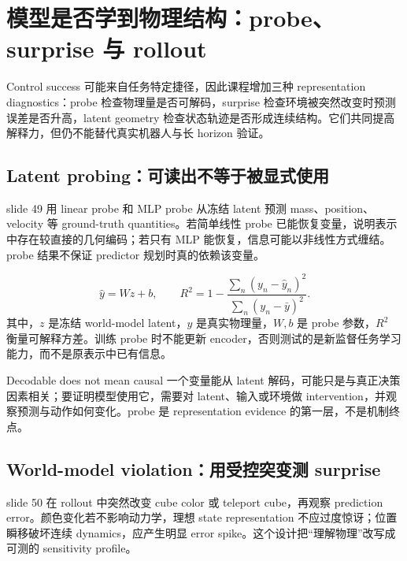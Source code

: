 \section{模型是否学到物理结构：probe、surprise 与 rollout}

Control success 可能来自任务特定捷径，因此课程增加三种 representation diagnostics：probe 检查物理量是否可解码，surprise 检查环境被突然改变时预测误差是否升高，latent geometry 检查状态轨迹是否形成连续结构。它们共同提高解释力，但仍不能替代真实机器人与长 horizon 验证。

\subsection{Latent probing：可读出不等于被显式使用}

slide 49 用 linear probe 和 MLP probe 从冻结 latent 预测 mass、position、velocity 等 ground-truth quantities。若简单线性 probe 已能恢复变量，说明表示中存在较直接的几何编码；若只有 MLP 能恢复，信息可能以非线性方式缠结。probe 结果不保证 predictor 规划时真的依赖该变量。


\[
\hat y=Wz+b,
\qquad
R^2=1-\frac{\sum_n(y_n-\hat y_n)^2}{\sum_n(y_n-\bar y)^2}.
\]
其中，$z$ 是冻结 world-model latent，$y$ 是真实物理量，$W,b$ 是 probe 参数，$R^2$ 衡量可解释方差。训练 probe 时不能更新 encoder，否则测试的是新监督任务学习能力，而不是原表示中已有信息。

\begin{warningbox}{Decodable does not mean causal}
一个变量能从 latent 解码，可能只是与真正决策因素相关；要证明模型使用它，需要对 latent、输入或环境做 intervention，并观察预测与动作如何变化。probe 是 representation evidence 的第一层，不是机制终点。
\end{warningbox}

\subsection{World-model violation：用受控突变测 surprise}

slide 50 在 rollout 中突然改变 cube color 或 teleport cube，再观察 prediction error。颜色变化若不影响动力学，理想 state representation 不应过度惊讶；位置瞬移破坏连续 dynamics，应产生明显 error spike。这个设计把``理解物理''改写成可测的 sensitivity profile。


